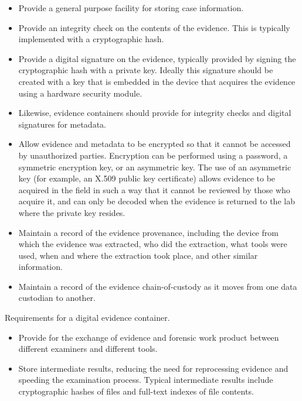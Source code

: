 \begin{table}
\begin{itemize}
\item Provide a general purpose facility for  storing case information.
\item Provide an integrity check on the contents of the evidence. This
  is typically implemented with a cryptographic hash.
\item Provide a digital signature on the evidence, typically provided
  by signing the cryptographic hash with a private key. Ideally this
  signature should be created with a key that is embedded in the
  device that acquires the evidence using a hardware security module.
\item Likewise, evidence containers should provide for integrity
  checks and digital signatures for metadata.
\item Allow evidence and metadata to be encrypted so that it cannot be accessed
  by unauthorized parties. Encryption can be performed using a
  password, a symmetric encryption key, or an asymmetric key. The use
  of an asymmetric key (for example, an X.509 public key certificate)
  allows evidence to be acquired in the field in such a way that it
  cannot be reviewed by those who acquire it, and can only be decoded
  when the evidence is returned to the lab where the private key
  resides.
\item Maintain a record of the evidence provenance, including the device from which the evidence was
  extracted, who did the extraction, what tools were used, when and
  where the extraction took place, and other similar information.
\item Maintain a record of the evidence chain-of-custody as it moves
  from one data custodian to another.
\end{itemize}
\caption{Requirements for a digital evidence container.}\label{container:requirements}
\end{table}


\begin{itemize}
\item Provide for the exchange of evidence and forensic
  work product between different examiners and different tools.
\item Store intermediate results, reducing the need for
  reprocessing evidence and speeding the examination process.
  Typical intermediate results include cryptographic hashes of files
  and full-text indexes of file contents.
\end{itemize}

